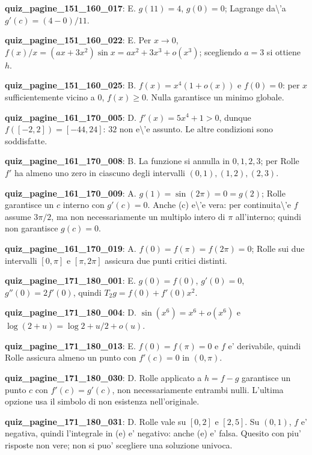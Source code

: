 \documentclass[11pt,a4paper]{article}
\newcounter{quiz}
\begin{document}
\noindent\textbf{quiz\_pagine\_151\_160\_017}: E. $g(11)=4$, $g(0)=0$; Lagrange da\textbackslash{}'a $g\prime(c)=(4-0)/11$.\par\medskip
\noindent\textbf{quiz\_pagine\_151\_160\_022}: E. Per $x\to0$, $f(x)/x=(ax+3x^2)\sin x=ax^2+3x^3+o(x^3)$; scegliendo $a=3$ si ottiene $h$.\par\medskip
\noindent\textbf{quiz\_pagine\_151\_160\_025}: B. $f(x)=x^4(1+o(x))$ e $f(0)=0$: per $x$ sufficientemente vicino a $0$, $f(x)\geq0$. Nulla garantisce un minimo globale.\par\medskip
\noindent\textbf{quiz\_pagine\_161\_170\_005}: D. $f'(x)=5x^4+1>0$, dunque $f([-2,2])=[-44,24]$: $32$ non e\textbackslash{}'e assunto. Le altre condizioni sono soddisfatte.\par\medskip
\noindent\textbf{quiz\_pagine\_161\_170\_008}: B. La funzione si annulla in $0,1,2,3$; per Rolle $f'$ ha almeno uno zero in ciascuno degli intervalli $(0,1),(1,2),(2,3)$.\par\medskip
\noindent\textbf{quiz\_pagine\_161\_170\_009}: A. $g(1)=\sin(2\pi)=0=g(2)$; Rolle garantisce un $c$ interno con $g'(c)=0$. Anche (c) e\textbackslash{}'e vera: per continuita\textbackslash{}'e $f$ assume $3\pi/2$, ma non necessariamente un multiplo intero di $\pi$ all'interno; quindi non garantisce $g(c)=0$.\par\medskip
\noindent\textbf{quiz\_pagine\_161\_170\_019}: A. $f(0)=f(\pi)=f(2\pi)=0$; Rolle sui due intervalli $[0,\pi]$ e $[\pi,2\pi]$ assicura due punti critici distinti.\par\medskip
\noindent\textbf{quiz\_pagine\_171\_180\_001}: E. $g(0)=f(0)$, $g'(0)=0$, $g''(0)=2f'(0)$, quindi $T_2g=f(0)+f'(0)x^2$.\par\medskip
\noindent\textbf{quiz\_pagine\_171\_180\_004}: D. $\sin(x^6)=x^6+o(x^6)$ e $\log(2+u)=\log2+u/2+o(u)$.\par\medskip
\noindent\textbf{quiz\_pagine\_171\_180\_013}: E. $f(0)=f(\pi)=0$ e $f$ e' derivabile, quindi Rolle assicura almeno un punto con $f'(c)=0$ in $(0,\pi)$.\par\medskip
\noindent\textbf{quiz\_pagine\_171\_180\_030}: D. Rolle applicato a $h=f-g$ garantisce un punto $c$ con $f'(c)=g'(c)$, non necessariamente entrambi nulli. L'ultima opzione usa il simbolo di non esistenza nell'originale.\par\medskip
\noindent\textbf{quiz\_pagine\_171\_180\_031}: D. Rolle vale su $[0,2]$ e $[2,5]$. Su $(0,1)$, $f$ e' negativa, quindi l'integrale in (e) e' negativo: anche (e) e' falsa. Quesito con piu' risposte non vere; non si puo' scegliere una soluzione univoca.\par\medskip
\end{document}
